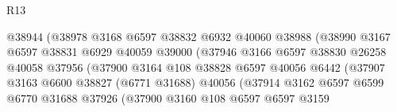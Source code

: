 \begin{lexlean}{R13}
\begin{coremodule}
                                        @38944
                                        (@38978
                                          @3168
                                          @6597
                                          @38832
                                          @6932
                                          @40060
                                          @38988
                                          (@38990
                                            @3167
                                            @6597
                                            @38831
                                            @6929
                                            @40059
                                            @39000
                                            (@37946
                                              @3166
                                              @6597
                                              @38830
                                              @26258
                                              @40058
                                              @37956
                                              (@37900
                                                @3164
                                                @108
                                                @38828
                                                @6597
                                                @40056
                                                @6442
                                                (@37907
                                                  @3163
                                                  @6600
                                                  @38827
                                                  (@6771 @31688)
                                                  @40056
                                                  (@37914
                                                    @3162
                                                    @6597
                                                    @6599
                                                    @6770
                                                    @31688
                                                    @37926
                                                    (@37900
                                                      @3160
                                                      @108
                                                      @6597
                                                      @6597
                                                      @3159

\end{coremodule}
\end{lexlean}
